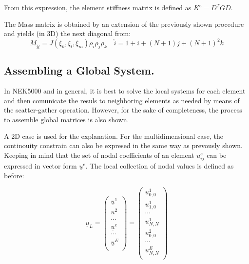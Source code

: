 \documentclass[
  a4paper,
  10pt]{article}
\begin{document}
From this expression, the element stiffness matrix is defined as
\(K^{e}=D^{T}GD\).

The Mass matrix is obtained by an extension of the previously shown
procedure and yields (in 3D) the next diagonal from: \begin{equation}
    M_{\hat{i}\hat{i}}= J(\xi_k,\xi_l,\xi_m)\rho_i\rho_j\rho_k \quad \hat{i}=1+i+(N+1)j+(N+1)^{2}k
\end{equation}

\hypertarget{assembling-a-global-system.}{%
\subsection{Assembling a Global
System.}\label{assembling-a-global-system.}}

In NEK5000 and in general, it is best to solve the local systems for
each element and then comunicate the resuls to neighboring elements as
needed by means of the scatter-gather operation. However, for the sake
of completeness, the process to assemble global matrices is also shown.

A 2D case is used for the explanation. For the multidimensional case,
the continouity constrain can also be expresed in the same way as
prevously shown. Keeping in mind that the set of nodal coefficients of
an element \(u^{e}_{ij}\) can be expressed in vector form
\(\underline{u}^{e}\). The local collection of nodal values is defined
as before:

\begin{equation}
    \underline{u}_L=
    \begin{pmatrix}
    \underline{u}^{1} \\
    \underline{u}^{2} \\
    \cdots \\
    \underline{u}^{e} \\
    \cdots \\
    \underline{u}^{E} \\
    \end{pmatrix}= 
    \begin{pmatrix}
    {u}^{1}_{0,0} \\
    {u}^{1}_{1,0} \\
    \cdots \\
    {u}^{1}_{N,N} \\
    {u}^{2}_{0,0} \\
    \cdots \\
    {u}^{E}_{N,N} \\
    \end{pmatrix}
\end{equation}
\end{document}

